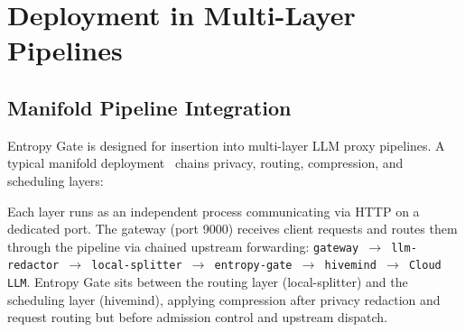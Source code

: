 \documentclass[11pt]{article}
\theoremstyle{remark}
\begin{document}
\section{Deployment in Multi-Layer Pipelines}
\label{sec:deployment}

\subsection{Manifold Pipeline Integration}

Entropy Gate is designed for insertion into multi-layer LLM proxy pipelines.
A typical manifold deployment~\cite{ollama} chains privacy, routing,
compression, and scheduling layers:

\begin{center}
\end{center}

Each layer runs as an independent process communicating via HTTP on a
dedicated port. The gateway (port 9000) receives client requests and
routes them through the pipeline via chained upstream forwarding:
\texttt{gateway $\to$ llm-redactor $\to$ local-splitter $\to$
entropy-gate $\to$ hivemind $\to$ Cloud LLM}. Entropy Gate sits between
the routing layer (local-splitter) and the scheduling layer (hivemind),
applying compression after privacy redaction and request routing but
before admission control and upstream dispatch.
\end{document}
